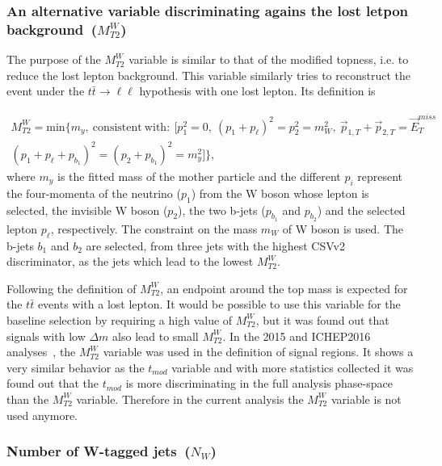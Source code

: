 \subsubsection{An alternative variable discriminating agains the lost letpon background~($M_{T2}^{W}$)~\label{sec:mt2w}}

The purpose of the $M_{T2}^{W}$ variable is similar to that of the modified topness, i.e. to reduce the lost lepton background. This variable similarly tries to reconstruct the event under the $t \bar{t} \to \ell \ell$ hypothesis with one lost lepton. Its definition is

\begin{equation}
\begin{split}
M_{T2}^{W} = \mathrm{min}\{m_{y},~\mathrm{consistent~with:}~[p_{1}^{2}=0,~(p_{1}+p_{\ell})^{2} = p_{2}^{2} =m_{W}^{2},~ \vec{p}_{1,T}+\vec{p}_{2,T}= \vec{E}_{T}^{miss} \\
(p_{1} + p_{\ell} + p_{b_{1}})^{2} =  (p_{2} + p_{b_{1}})^{2} = m_{y}^{2}]\},
\end{split}
\end{equation}
where $m_{y}$ is the fitted mass of the mother particle and the different $p_{i}$ represent the four-momenta of the neutrino ($p_{1}$) from the W boson whose lepton is selected, the invisible W boson ($p_{2}$), the two b-jets ($p_{b_{1}}$ and $p_{b_{2}}$) and the selected lepton $p_{\ell}$, respectively. The constraint on the mass $m_{W}$ of W boson is used. The b-jets $b_{1}$ and $b_{2}$ are selected, from three jets with the highest CSVv2 discriminator, as the jets which lead to the lowest $M_{T2}^{W}$.

Following the definition of $M_{T2}^{W}$,  an endpoint around the top mass is expected for the $t\bar{t}$ events with a lost lepton. It would be possible to use this variable for the baseline selection by requiring a high value of $M_{T2}^{W}$, but it was found out that signals with low $\Delta m$ also lead to small $M_{T2}^{W}$. In the 2015 and ICHEP2016 analyses~\cite{Sirunyan:2016jpr, CMS:2016vew}, the $M_{T2}^{W}$ variable was used in the definition of signal regions. It shows a  very similar behavior as the $t_{mod}$ variable and with more statistics collected it was found out that the $t_{mod}$ is more discriminating in the full analysis phase-space than the $M_{T2}^{W}$ variable. Therefore in the current analysis the $M_{T2}^{W}$ variable is not used anymore.


\subsubsection{Number of W-tagged jets~($N_{W}$)}

